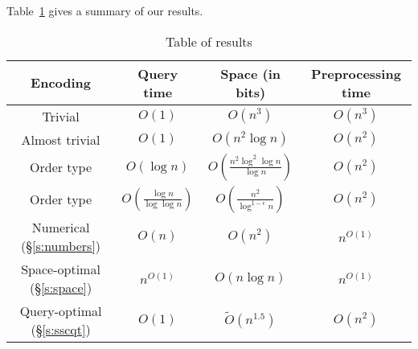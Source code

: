 Table~\ref{tor} gives a summary of our results.

\begin{table}
\centering
\caption{Table of results}\label{tor}
\begin{tabular}{cccc}
Encoding & Query time & Space (in bits) & Preprocessing time \\ \hline
Trivial & $O(1)$ & $O(n^3)$ & $O(n^3)$ \\
Almost trivial & $O(1)$ & $O(n^2 \log n)$ & $O(n^2)$ \\
Order type \cite{CCILO18} & $O(\log n)$ & $O(\frac{n^2 \log^2 \log n}{\log n})$ & $O(n^2) $\\
Order type \cite{CCILO18} & $O(\frac{\log n}{\log \log n})$ & $O(\frac{n^2 }{\log^{1-\epsilon} n})$ & $O(n^2)$ \\
Numerical (\S\ref{s:numbers}) & $O(n)$ & $O(n^2)$ & $n^{O(1)}$\\
Space-optimal (\S\ref{s:space}) & $n^{O(1)}$ & $O(n \log n)$ & $n^{O(1)}$\\
Query-optimal (\S\ref{s:sscqt}) &  $O(1)$ & $\tilde{O}(n^{1.5})$ & $O(n^{2})$ \\
\end{tabular}
\end{table}

